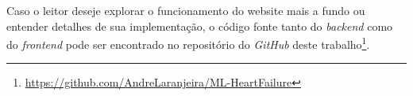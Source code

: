 Caso o leitor deseje explorar o funcionamento do website mais a fundo ou entender detalhes de sua implementação, o código fonte tanto do \textit{backend} como do \textit{frontend} pode ser encontrado no repositório do \textit{GitHub} deste trabalho\footnote{\url{https://github.com/AndreLaranjeira/ML-HeartFailure}}.
